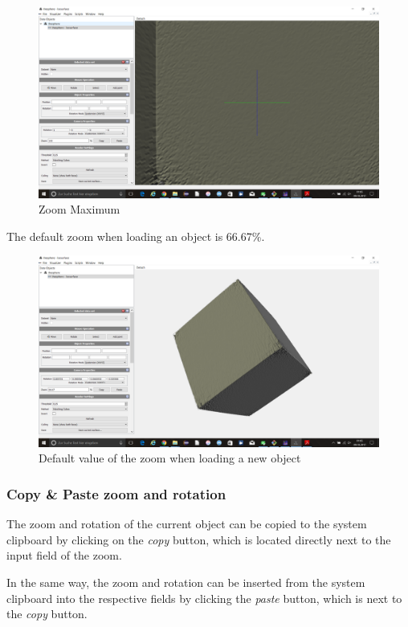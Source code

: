 \begin{figure}[h!]
  \centering
  \includegraphics[width=1.0\textwidth]{img/zoomMaximum.png}
  \caption{Zoom Maximum}
\end{figure}

The default zoom when loading an object is 66.67\%.

\begin{figure}[h!]
  \centering
  \includegraphics[width=1.0\textwidth]{img/zoomdefault.png}
  \caption{Default value of the zoom when loading a new object}
\end{figure}

\subsubsection{Copy \& Paste zoom and rotation}\label{Copy&PasteZoom&Rotation}

The zoom and rotation of the current object can be copied to the system clipboard by clicking on the \textit{copy} button, which is located directly next to the input field of the zoom.

In the same way, the zoom and rotation can be inserted from the system clipboard into the respective fields by clicking the \textit{paste} button, which is next to the \textit{copy} button.

